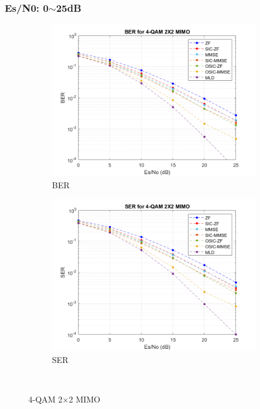 \documentclass{article}
\begin{document}
\subsubsection{Es/N0: 0$\sim$25dB}
\begin{figure}[H]
	\centering
	\begin{subfigure}{0.5\textwidth}
		\centerline{\includegraphics[width=1\textwidth]{BER_2x2_4qam.png}}
		\caption{BER}
	\end{subfigure}%
	\begin{subfigure}{0.5\textwidth}
		\centerline{\includegraphics[width=1\textwidth]{SER_2x2_4qam.png}}
		\caption{SER}
	\end{subfigure}\\%
	\caption{4-QAM 2$\times$2 MIMO}
\end{figure}
\end{document}
